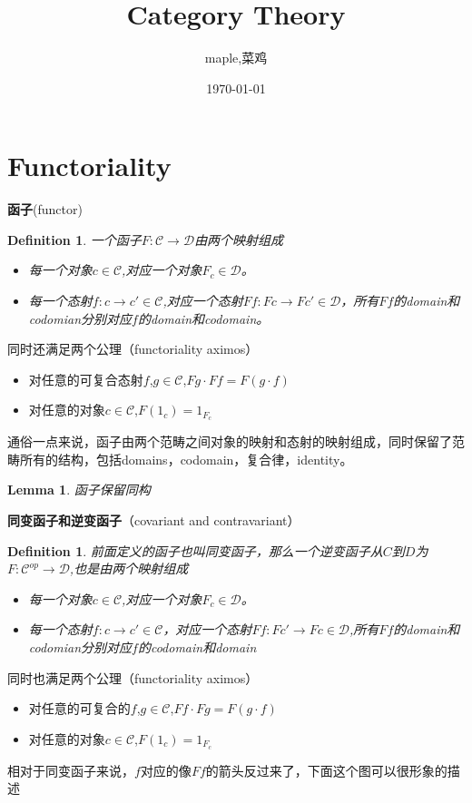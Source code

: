 \documentclass{article}
\title{Category Theory}
\author{maple,菜鸡}
\date{\today}
\newtheorem{lemma}[theorem]{Lemma}
\newtheorem{definition}[theorem]{Definition}
\begin{document}
\maketitle

\section{Functoriality}

\begin{flushleft}
\textbf{函子}(functor)\\
\begin{definition}
一个函子$F \colon \mathcal{C} \rightarrow \mathcal{D}$由两个映射组成
\begin{itemize}
 \item 每一个对象$c \in \mathcal{C}$,对应一个对象$F_c \in \mathcal{D}$。
 \item 每一个态射$f \colon c \rightarrow	c' \in \mathcal{C}$,对应一个态射$Ff \colon Fc \rightarrow Fc' \in \mathcal{D}$，所有$Ff$的domain和codomian分别对应$f$的domain和codomain。 
\end{itemize}
\end{definition}
同时还满足两个公理（functoriality aximos）
\begin{itemize}
 	\item 对任意的可复合态射$f$,$g \in \mathcal{C}$,$Fg \cdot Ff = F(g \cdot f)$
 	\item 对任意的对象$c \in \mathcal{C}$,$F(1_c)=1_{F_c}$
\end{itemize}
通俗一点来说，函子由两个范畴之间对象的映射和态射的映射组成，同时保留了范畴所有的结构，包括domains，codomain，复合律，identity。
\end{flushleft}

\begin{lemma}
函子保留同构
\end{lemma}

\begin{flushleft}
\textbf{同变函子和逆变函子}（covariant and contravariant）\\
\begin{definition}
前面定义的函子也叫同变函子，那么一个逆变函子从$C$到$D$为$F: \mathcal{C}^{op} \rightarrow \mathcal{D} $,也是由两个映射组成
\begin{itemize}
	\item 每一个对象$c \in \mathcal{C}$,对应一个对象$F_c \in \mathcal{D}$。
	\item 每一个态射$f \colon c \rightarrow	c' \in \mathcal{C}$，对应一个态射$Ff \colon Fc' \rightarrow Fc \in \mathcal{D}$,所有$Ff$的domain和codomian分别对应$f$的codomain和domain
\end{itemize}
\end{definition}
同时也满足两个公理（functoriality aximos）\\
\begin{itemize}
	\item 对任意的可复合的$f$,$g \in \mathcal{C}$,$Ff \cdot Fg = F(g \cdot f)$
	\item 对任意的对象$c \in \mathcal{C}$,$F(1_c)=1_{F_c}$
\end{itemize}
相对于同变函子来说，$f$对应的像$Ff$的箭头反过来了，下面这个图可以很形象的描述	
\end{flushleft}
\end{document}
